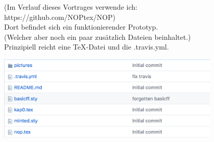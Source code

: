 


\newpage
(Im Verlauf dieses Vortrages verwende ich:\\

https://github.com/NOPtex/NOP)\\


Dort befindet sich ein funktionierender Prototyp. \\
(Welcher aber noch ein paar zusätzlich Dateien beinhaltet.) \\

Prinzipiell reicht eine \TeX -Datei und die .travis.yml.

\begin{center}
  \includegraphics[width=0.8\textwidth]{./bilder/2Boilerplate.png}
\end{center}

%
%
%

%
%

\newpage %


